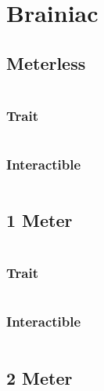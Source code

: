 \documentclass[main.tex]{subfiles}
\begin{document}
\chapter{Brainiac}

\section{Meterless}

\begin{lstlisting}[language=FG]
\end{lstlisting}

\subsection{Trait}

\begin{lstlisting}[language=FG]
\end{lstlisting}


\subsection{Interactible}
\begin{lstlisting}[language=FG]

\end{lstlisting}

\section{1 Meter}


\begin{lstlisting}[language=FG]
\end{lstlisting}

\subsection{Trait}

\begin{lstlisting}[language=FG]
\end{lstlisting}


\subsection{Interactible}
\begin{lstlisting}[language=FG]

\end{lstlisting}

\section{2 Meter}
\end{document}
